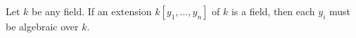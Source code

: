 Let $k$ be any field. If an extension $k[y_1, \ldots, y_n]$ of $k$ is a field, then each $y_i$ must be algebraic over $k$.
